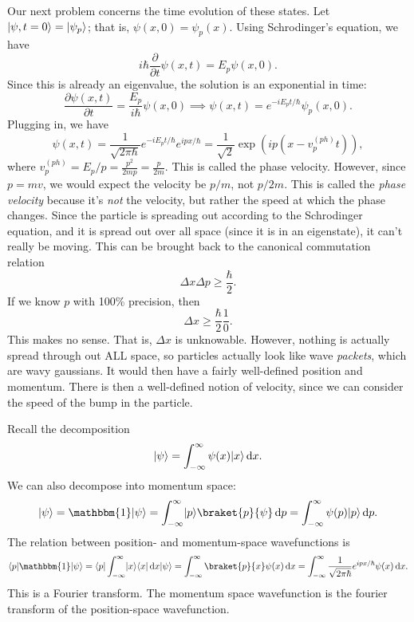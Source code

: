 Our next problem concerns the time evolution of these states. Let $\lvert\psi ,t=0\rangle =\lvert\psi _p\rangle $; that is, $\psi (x,0)=\psi _p(x)$. Using Schrodinger's equation, we have
\[
	i\hbar \frac{\partial }{\partial t} \psi (x,t)=E_p\psi (x,0)
.\]
Since this is already an eigenvalue, the solution is an exponential in time:
\[
	\frac{\partial \psi (x,t)}{\partial t} =\frac{E_p}{i\hbar } \psi (x,0)\implies \psi (x,t)=e^{-iE_pt/\hbar } \psi _p(x,0)
.\]
Plugging in, we have
\[
	\psi (x,t)=\frac{1}{\sqrt{2\pi \hbar } } e^{-iE_pt/\hbar } e^{ipx/\hbar } =\frac{1}{\sqrt{2} } \exp \left( ip(x-v_p^{(ph)} t) \right) ,
\]
where $v_p^{(ph)} =E_p/p=\frac{p^2}{2mp} =\frac{p}{2m} $. This is called the phase velocity. However, since $p=mv$, we would expect the velocity be $p/m$, not $p/2m$. This is called the \emph{phase velocity} because it's \emph{not} the velocity, but rather the speed at which the phase changes. Since the particle is spreading out according to the Schrodinger equation, and it is spread out over all space (since it is in an eigenstate), it can't really be moving. This can be brought back to the canonical commutation relation
\[
	\Delta x\Delta p\geq \frac{\hbar }{2} 
.\]
If we know $p$ with 100\% precision, then
\[
	\Delta x\geq \frac{\hbar }{2} \frac{1}{0} 
.\]
This makes no sense. That is, $\Delta x$ is unknowable. However, nothing is actually spread through out ALL space, so particles actually look like wave \emph{packets}, which are wavy gaussians. It would then have a fairly well-defined position and momentum. There is then a well-defined notion of velocity, since we can consider the speed of the bump in the particle.

Recall the decomposition
\[
	\lvert\psi \rangle =\int_{-\infty } ^{\infty }  \psi (x)\lvert x\rangle  \,\mathrm{d} x
.\]
We can also decompose into momentum space:
\[
	\ket{\psi } =\mathbbm{1}\ket{\psi } =\int_{-\infty }^{\infty } \ket{p} \braket{p}{\psi }  \,\mathrm{d} p=\int_{-\infty }^{\infty } \psi(p)\ket{p}  \,\mathrm{d} p
.\]
The relation between position- and momentum-space wavefunctions is
\[
	\bra{p } \mathbbm{1}\ket{\psi } =\bra{p} \int_{-\infty }^{\infty } \ket{x} \bra{x}  \,\mathrm{d} x\ket{\psi } =\int_{-\infty }^{\infty } \braket{p}{x} \psi (x) \,\mathrm{d} x=\int_{-\infty }^{\infty } \frac{1}{\sqrt{2\pi \hbar } } e^{ipx/\hbar } \psi (x) \,\mathrm{d} x
.\]
This is a Fourier transform. The momentum space wavefunction is the fourier transform of the position-space wavefunction.
